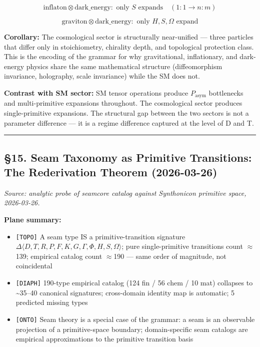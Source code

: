 \documentclass[12pt,a4paper]{article}
\newcommand{\pilcrow}{\S}
\begin{document}
\[\text{inflaton} \otimes \text{dark\_energy}: \text{ only } S \text{ expands} \quad (1:1 \to n:m)\]




\[\text{graviton} \otimes \text{dark\_energy}: \text{ only } H, S, \Omega \text{ expand}\]

\textbf{Corollary:} The cosmological sector is structurally near-unified --- three particles that differ only in stoichiometry, chirality depth, and topological protection class. This is the encoding of the grammar for why gravitational, inflationary, and dark-energy physics share the same mathematical structure (diffeomorphism invariance, holography, scale invariance) while the SM does not.

\textbf{Contrast with SM sector:} SM tensor operations produce $P_{\text{asym}}$ bottlenecks and multi-primitive expansions throughout. The cosmological sector produces single-primitive expansions. The structural gap between the two sectors is not a parameter difference --- it is a regime difference captured at the level of D and T.

\begin{center}
\rule{0.5\textwidth}{0.4pt}
\end{center}

\subsection{\pilcrow{}15. Seam Taxonomy as Primitive Transitions: The Rederivation Theorem (2026-03-26)}

\emph{Source: analytic probe of seamcore catalog against Synthonicon primitive space, 2026-03-26.}

\textbf{Plane summary:}

\begin{itemize}
    \item \texttt{{[}TOPO{]}} A seam type IS a primitive-transition signature $\Delta\langle D,T,R,P,F,K,G,\Gamma,\Phi,H,S,\Omega\rangle$; pure single-primitive transitions count $\approx$139; empirical catalog count $\approx$190 --- same order of magnitude, not coincidental
    \item \texttt{{[}DIAPH{]}} 190-type empirical catalog (124 fin / 56 chem / 10 mat) collapses to \textasciitilde{}35--40 canonical signatures; cross-domain identity map is automatic; 5 predicted missing types
    \item \texttt{{[}ONTO{]}} Seam theory is a special case of the grammar: a seam is an observable projection of a primitive-space boundary; domain-specific seam catalogs are empirical approximations to the primitive transition basis
\end{itemize}
\end{document}
